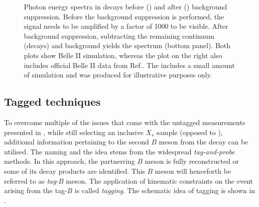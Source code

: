 \begin{figure}[htbp!]
    \centering
    \caption{\label{fig:untagged_btosgamma}Photon energy spectra in \BtoXsgamma decays before () and after () background suppression.
    Before the background suppression is performed, the signal needs to be amplified by a factor of 1000 to be visible.
    After background suppression, subtracting the remaining continuum (\epem\ra\qqbar decays) and \BB background yields the \BtoXsgamma spectrum (bottom panel).
    Both plots show Belle II simulation, whereas the plot on the right also includes official Belle II data from Ref.\cite{Collaboration:2302}.
    The  includes a small amount of simulation and was produced for illustrative purposes only. 
    }
\end{figure}

\subsection{Tagged techniques}

To overcome multiple of the issues that come with the untagged measurements presented in , while still selecting an inclusive $X_s$ sample (opposed to ), 
additional information pertaining to the second $B$ meson from the \FourS decay can be utilised.
The naming and the idea stems from the widespread \textit{tag-and-probe} methods.
In this approach, the partnerring $B$ meson is fully reconstructed or some of its decay products are identified.
This $B$ meson will henceforth be referred to as \textit{tag}-$B$ meson.
The application of kinematic constraints on the event arising from the tag-$B$ is called \textit{tagging}.
The schematic idea of tagging is shown in .

